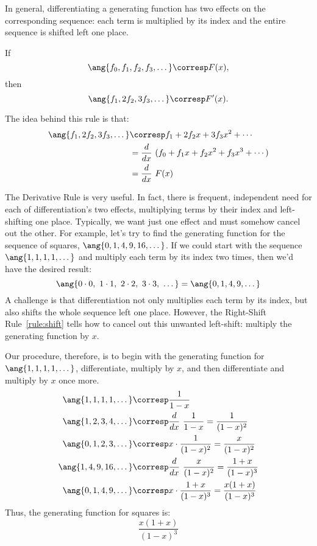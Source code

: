 In general, differentiating a generating function has two effects on
the corresponding sequence: each term is multiplied by its index and
the entire sequence is shifted left one place.

\begin{mathrule}
\label{rule:derivative}
If
\[
\ang{f_0, f_1, f_2, f_3, \dots} \corresp F(x),
\]
then
%
\[
\ang{f_1, 2f_2, 3f_3, \dots} \corresp F'(x).
\]
\end{mathrule}

The idea behind this rule is that:
\begin{align*}
\ang{f_1, 2f_2, 3f_3, \dots}
    & \corresp f_1 + 2 f_2 x + 3 f_3 x^2 + \cdots \\
    & = \frac{d}{dx} \ (f_0 + f_1 x + f_2 x^2 + f_3 x^3 + \cdots) \\
    & = \frac{d}{dx} \ F(x)
\end{align*}

The Derivative Rule is very useful.  In fact, there is frequent,
independent need for each of differentiation's two effects,
multiplying terms by their index and left-shifting one place.
Typically, we want just one effect and must somehow cancel out the
other.  For example, let's try to find the generating function for the
sequence of squares, $\ang{0, 1, 4, 9, 16, \dots}$.  If we could
start with the sequence $\ang{1, 1, 1, 1, \dots}$ and multiply each term by
its index two times, then we'd have the desired result:
%
\[
\ang{0 \cdot 0,\ 1 \cdot 1,\ 2 \cdot 2,\ 3 \cdot 3,\ \dots}
=
\ang{0, 1, 4, 9, \dots}
\]
%
A challenge is that differentiation not only multiplies each term by
its index, but also shifts the whole sequence left one place.
However, the Right-Shift Rule~\ref{rule:shift} tells how to cancel out
this unwanted left-shift: multiply the generating function by $x$.

Our procedure, therefore, is to begin with the generating function for
$\ang{1, 1, 1, 1, \dots}$, differentiate, multiply by $x$, and then
differentiate and multiply by $x$ once more.
%
\begin{align*}
\ang{1, 1, 1, 1, \dots}  & \corresp \frac{1}{1-x} \\
\ang{1, 2, 3, 4, \dots}  & \corresp \frac{d}{dx} \ \frac{1}{1-x}
                                          = \frac{1}{(1-x)^2} \\
\ang{0, 1, 2, 3, \dots}  & \corresp x \cdot \frac{1}{(1-x)^2}
                                          = \frac{x}{(1-x)^2} \\
\ang{1, 4, 9, 16, \dots} & \corresp \frac{d}{dx} \ \frac{x}{(1-x)^2}
                                          = \frac{1+x}{(1-x)^3} \\
\ang{0, 1, 4, 9, \dots}  & \corresp x \cdot \frac{1+x}{(1-x)^3}
                                          = \frac{x(1+x)}{(1-x)^3}
\end{align*}
%
Thus, the generating function for squares is:
%
\begin{equation}\label{squares_gen_func}
\frac{x(1+x)}{(1-x)^3}
\end{equation}

